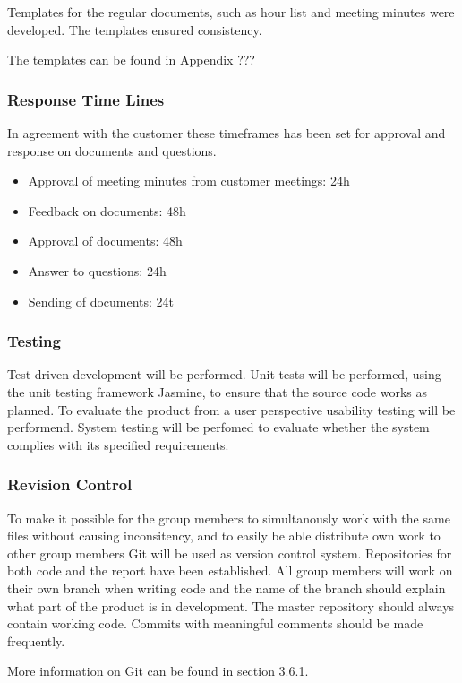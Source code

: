 Templates for the regular documents, such as hour list and meeting minutes were developed. The templates ensured consistency.

The templates can be found in Appendix ???

\subsubsection{Response Time Lines}

In agreement with the customer these timeframes has been set for approval and response on documents and questions.

\begin{itemize}
	\item Approval of meeting minutes from customer meetings: 24h
	\item Feedback on documents: 48h
	\item Approval of documents: 48h
	\item Answer to questions: 24h
	\item Sending of documents: 24t
\end{itemize}

\subsubsection{Testing}

Test driven development will be performed. Unit tests will be performed, using the unit testing framework Jasmine, to ensure that the source code works as planned. To evaluate the product from a user perspective usability testing will be performend. System testing will be perfomed to evaluate whether the system complies with its specified requirements.

\subsubsection{Revision Control}

To make it possible for the group members to simultanously work with the same files without causing inconsitency, and to easily be able distribute own work to other group members Git will be used as version control system. Repositories for both code and the report have been established. All group members will work on their own branch when writing code and the name of the branch should explain what part of the product is in development. The master repository should always contain working code. Commits with meaningful comments should be made frequently.

More information on Git can be found in section 3.6.1.